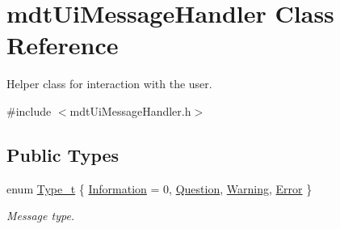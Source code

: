 \hypertarget{classmdt_ui_message_handler}{\section{mdt\-Ui\-Message\-Handler Class Reference}
\label{classmdt_ui_message_handler}
}


Helper class for interaction with the user.  




{\ttfamily \#include $<$mdt\-Ui\-Message\-Handler.\-h$>$}

\subsection*{Public Types}
\begin{DoxyCompactItemize}
\item 
enum \hyperlink{classmdt_ui_message_handler_a115062a2ab56f3d7386d35e34f075fcf}{Type\-\_\-t} \{ \hyperlink{classmdt_ui_message_handler_a115062a2ab56f3d7386d35e34f075fcfae672e492ccbcd4fd6bdc18f70abcb49a}{Information} = 0, 
\hyperlink{classmdt_ui_message_handler_a115062a2ab56f3d7386d35e34f075fcfa151426e75df30b9ce13235cdbab922d1}{Question}, 
\hyperlink{classmdt_ui_message_handler_a115062a2ab56f3d7386d35e34f075fcfa42a962ea68657fa6ec2aa2c706bcdab6}{Warning}, 
\hyperlink{classmdt_ui_message_handler_a115062a2ab56f3d7386d35e34f075fcfab65e25b12ad104fd638367ba160f6edf}{Error}
 \}
\begin{DoxyCompactList}\small\item\em Message type. \end{DoxyCompactList}\end{DoxyCompactItemize}
